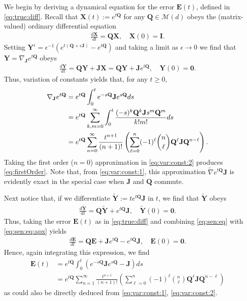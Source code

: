\documentclass[9pt,twocolumn,twoside]{pnas-new}
\newcommand{\?}{\textbf{?}}
\newcommand{\X}{\textbf{X}}
\newcommand{\Y}{\textbf{Y}}
\newcommand{\QQ}{\mathbf{Q}}
\newcommand{\JJ}{\mathbf{J}}
\newcommand{\II}{\mathbf{I}}
\newcommand{\Zero}{\boldsymbol{0}}
\newcommand{\Z}{\mathbf{E}}
\begin{document}
We begin by deriving a dynamical equation for the error $\Z(t)$, defined in
\eqref{eq:true:diff}. Recall that $\X(t) := e^{t \QQ}$ for any
$\QQ \in \mathcal{M}(d)$ obeys the (matrix-valued) ordinary
differential equation
\begin{align}
   \frac{d\X}{dt} = \QQ \X, \quad \X(0) = \II.
\end{align}
Setting
$\Y^\epsilon = \epsilon^{-1} ( e^{t (\QQ+ \epsilon \JJ)}- e^{t \QQ})$
and taking a limit as $\epsilon \to 0$ we find that
$\Y = \nabla_{\JJ} e^{t \QQ}$ obeys
\begin{align}
  \frac{d \Y}{dt}  = \QQ \Y + \JJ \X = \QQ \Y + \JJ e^{t \QQ},
  \quad \Y(0) = \Zero.
	\label{eq:sen:eq}
\end{align}
Thus, variation of constants yields that, for any $t \geq 0$,
\begin{align}
	\nabla_{\JJ} e^{t \QQ} &= e^{t \QQ} \int_0^t e^{-s\QQ} \JJ e^{s\QQ} ds \label{eq:var:const:1}\\
	&=  e^{t \QQ} \sum_{k,m = 0}^\infty \int_0^t \frac{(-s)^{k} \QQ^k \JJ s^{m}\QQ^m}{k!m!}ds
		\notag\\
	&=  e^{t \QQ} \sum_{n = 0}^\infty \frac{t^{n+1}}{(n+1)!}  
	\left( \sum_{\ell = 0}^n (-1)^\ell \binom{n}{\ell} \QQ^\ell \JJ \QQ^{n -\ell}\right).
	\label{eq:var:const:2}
\end{align}
Taking the first order ($n=0$) approximation in \eqref{eq:var:const:2} produces
\eqref{eq:firstOrder}.  Note that, from \eqref{eq:var:const:1}, this
approximation $\widetilde{\nabla}e^{t\QQ}\JJ$ is evidently exact in the
special case when $\JJ$ and $\QQ$ commute.


Next notice that, if we differentiate $\widetilde{\Y} := t e^{t \QQ} \JJ$ in $t$, we
find that $\widetilde{\Y}$ obeys
\begin{align}\label{eq:sen:eq:apx}
  \frac{d \widetilde{\Y}}{dt} = \QQ \widetilde{\Y} +  e^{t \QQ} \JJ,
  \quad \widetilde{\Y}(0) = \Zero.
\end{align}
Thus, taking the error $\Z(t)$ as in \eqref{eq:true:diff} and
combining \eqref{eq:sen:eq} with \eqref{eq:sen:eq:apx} yields
\begin{align}
\label{eq:Z:dym}
  \frac{d\Z}{dt} = \QQ \Z + \JJ e^{t \QQ} -  e^{t \QQ} \JJ,
  \quad \Z(0) = \Zero.
\end{align}
Hence, again integrating this expression, we find
\begin{align}
  \Z(t) &= e^{t \QQ} \int_0^t (e^{-s \QQ} \JJ e^{s \QQ} - \JJ) ds
 \label{eq:ass:procs:0}\\
	&=  e^{t \QQ} \sum_{n = 1}^\infty \frac{t^{n+1}}{(n+1)!}  
   \left( \sum_{\ell = 0}^n (-1)^\ell
   \binom{n}{\ell} \QQ^\ell \JJ \QQ^{n -\ell}\right)
   \label{eq:ass:procs}
\end{align}
as could also be directly deduced from \eqref{eq:var:const:1},
\eqref{eq:var:const:2}.
\end{document}
